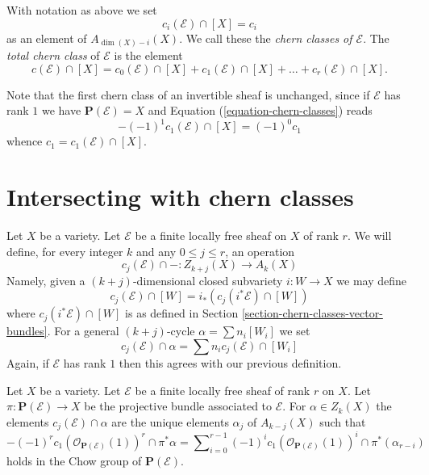 \begin{definition}
\label{definition-chern-classes}
With notation as above we set
$$
c_i(\mathcal{E}) \cap [X] = c_i
$$
as an element of $A_{\dim(X) - i}(X)$.
We call these the {\it chern classes of $\mathcal{E}$}.
The {\it total chern class} of 
${\mathcal E}$ is the element
$$
c({\mathcal E}) \cap [X] = 
c_0({\mathcal E}) \cap [X] + c_1({\mathcal E}) \cap [X] + \ldots
+ c_r({\mathcal E}) \cap [X].
$$
\end{definition}

\noindent
Note that the first chern class of an invertible
sheaf is unchanged, since if $\mathcal{E}$ has rank $1$ we have
$\mathbf{P}(\mathcal{E}) = X$ and Equation (\ref{equation-chern-classes})
reads
$$
-(-1)^1 c_1(\mathcal{E}) \cap [X] = (-1)^0 c_1
$$
whence $c_1 = c_1(\mathcal{E}) \cap [X]$.




\section{Intersecting with chern classes}
\label{section-intersecting-chern-classes}

\noindent
Let $X$ be a variety. Let $\mathcal{E}$ be a finite locally free sheaf on $X$
of rank $r$. We will define, for every integer $k$ and any
$0 \leq j \leq r$, an operation
$$
c_j(\mathcal{E}) \cap - :
Z_{k + j}(X) \to A_k(X)
$$
Namely, given a $(k + j)$-dimensional closed subvariety
$i : W \to X$ we may define
$$
c_j(\mathcal{E}) \cap [W] = i_*(c_j({i^*\mathcal{E}}) \cap [W])
$$
where $c_j({i^*\mathcal{E}}) \cap [W]$ is as defined in
Section \ref{section-chern-classes-vector-bundles}.
For a general $(k + j)$-cycle $\alpha = \sum n_i [W_i]$ we set
$$
c_j(\mathcal{E}) \cap \alpha = \sum n_i c_j(\mathcal{E}) \cap [W_i]
$$
Again, if $\mathcal{E}$ has rank $1$ then this agrees with our
previous definition.

\begin{lemma}
\label{lemma-determine-intersections}
Let $X$ be a variety.
Let $\mathcal{E}$ be a finite locally free sheaf of rank $r$ on $X$.
Let $\pi : \mathbf{P}(\mathcal{E}) \to X$ be the projective bundle
associated to $\mathcal{E}$.
For $\alpha \in Z_k(X)$ the elements
$c_j(\mathcal{E}) \cap \alpha$ are the unique elements
$\alpha_j$ of $A_{k - j}(X)$
such that
$$
-(-1)^r c_1(\mathcal{O}_{\mathbf{P}(\mathcal{E})}(1))^r \cap \pi^*\alpha
=
\sum\nolimits_{i = 0}^{r - 1}
(-1)^i c_1(\mathcal{O}_{\mathbf{P}(\mathcal{E})}(1))^i \cap
\pi^*(\alpha_{r - i})
$$
holds in the Chow group of $\mathbf{P}(\mathcal{E})$.
\end{lemma}

